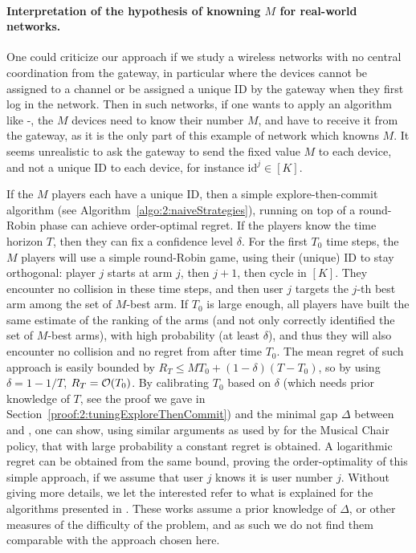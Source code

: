 \paragraph{Interpretation of the hypothesis of knowning $M$ for real-world networks.}
\label{par:5:knowingYourIDinMPBanditsGame}
%
One could criticize our approach if we study a wireless networks with no central coordination from the gateway,
in particular where the devices cannot be assigned to a channel or be assigned a unique ID by the gateway when they first log in the network.
Then in such networks, if one wants to apply an algorithm like \MCTopM-\klUCB,
the $M$ devices need to know their number $M$, and have to receive it from the gateway, as it is the only part of this example of network which knowns $M$.
It seems unrealistic to ask the gateway to send the fixed value $M$ to each device, and not a unique ID to each device, for instance $\mathrm{id}^j\in[K]$.


If the $M$ players each have a unique ID, then a simple explore-then-commit algorithm (see Algorithm~\ref{algo:2:naiveStrategies}), running on top of a round-Robin phase can achieve order-optimal regret.
If the players know the time horizon $T$, then they can fix a confidence level $\delta$. For the first $T_0$ time steps, the $M$ players will use a simple round-Robin game, using their (unique) ID to stay orthogonal: player $j$ starts at arm $j$, then $j+1$, then cycle in $[K]$. They encounter no collision in these time steps, and then user $j$ targets the $j$-th best arm among the set of $M$-best arm.
If $T_0$ is large enough, all players have built the same estimate of the ranking of the arms (and not only correctly identified the set of $M$-best arms), with high probability (at least $\delta$), and thus they will also encounter no collision and no regret from after time $T_0$.
The mean regret of such approach is easily bounded by $R_T \leq M T_0 + (1 - \delta) (T - T_0)$, so by using $\delta = 1-1/T$, $R_T = \mathop{}\mathopen{}\mathcal{O}\mathopen{}\left(T_0\right)$.
By calibrating $T_0$ based on $\delta$ (which needs prior knowledge of $T$, see the proof we gave in Section~\ref{proof:2:tuningExploreThenCommit}) and the minimal gap $\Delta$ between \Mbest{} and \Mworst, one can show, using similar arguments as used by \cite{Rosenski16} for the Musical Chair policy, that with large probability a constant regret is obtained. A logarithmic regret can be obtained from the same bound, proving the order-optimality of this simple approach, if we assume that user $j$ knows it is user number $j$.
%
Without giving more details, we let the interested refer to what is explained for the algorithms presented in \cite{DarakHanawal18,JoshiKumar2018,KumarDarak2019}.
%
These works assume a prior knowledge of $\Delta$, or other measures of the difficulty of the problem, and as such we do not find them comparable with the approach chosen here.


